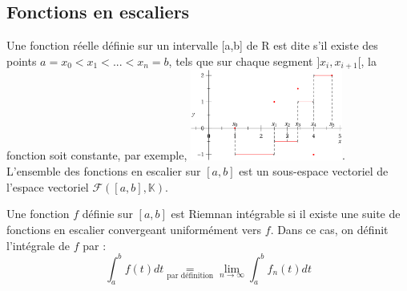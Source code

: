 \documentclass{book}
\begin{document}
\subsection{Fonctions en escaliers}
\begin{Definition} Une fonction réelle définie sur un intervalle [a,b] de R est dite  s'il existe des points $a=x_0<x_1<...<x_n=b$, tels que sur chaque segment $]x_i,x_{i+1}[$, la fonction soit constante, par exemple, 
\includegraphics[width=5cm]{escalier1.png}.\\
L'ensemble des fonctions en escalier sur $[a,b]$ est un sous-espace vectoriel de l'espace vectoriel $\mathcal{F}([a,b],\mathbb{K})$.
\end{Definition}

\begin{Definition} Une fonction $f$ définie sur $[a,b]$ est Riemnan intégrable si il existe une suite de fonctions en escalier convergeant uniformément vers $f$. Dans ce cas, on définit l'intégrale de $f$ par :
$$ \int_a^b f(t)dt\underset{\text{par définition}}{=}\lim_{n\to\infty}\int_a^b f_n(t)dt$$
\end{Definition}
%
%
%
%
%
\end{document}
